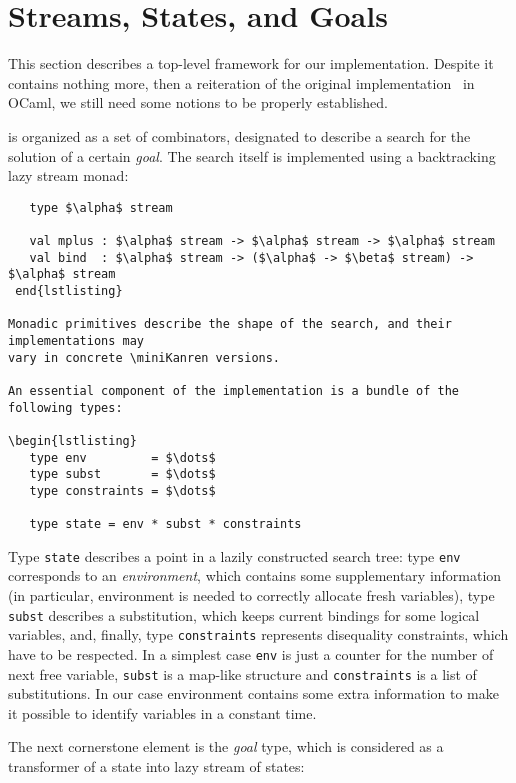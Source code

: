 \section{Streams, States, and Goals}
\label{sec:goals}

This section describes a top-level framework for our implementation. Despite it contains
nothing more, then a reiteration of the original implementation~\cite{MicroKanren, CKanren} 
in OCaml, we still need some notions to be properly established.

\miniKanren is organized as a set of combinators, designated to describe a search for
the solution of a certain \emph{goal}. The search itself is implemented using a
backtracking lazy stream monad:

\begin{lstlisting}
   type $\alpha$ stream 

   val mplus : $\alpha$ stream -> $\alpha$ stream -> $\alpha$ stream
   val bind  : $\alpha$ stream -> ($\alpha$ -> $\beta$ stream) -> $\alpha$ stream
 end{lstlisting}

Monadic primitives describe the shape of the search, and their implementations may 
vary in concrete \miniKanren versions.

An essential component of the implementation is a bundle of the following types:

\begin{lstlisting}
   type env         = $\dots$
   type subst       = $\dots$
   type constraints = $\dots$

   type state = env * subst * constraints
\end{lstlisting}

Type \lstinline{state} describes a point in a lazily constructed search tree: type \lstinline{env} corresponds 
to an \emph{environment}, which contains some supplementary information (in particular, environment is needed to
correctly allocate fresh variables), type \lstinline{subst} describes a substitution, which keeps current bindings 
for some logical variables, and, finally, type \lstinline{constraints} represents disequality constraints, 
which have to be respected. In a simplest case \lstinline{env} is just a counter for the number of next free
variable, \lstinline{subst} is a map-like structure and \lstinline{constraints} is a list of substitutions. In our
case environment contains some extra information to make it possible to identify variables in a constant time.

The next cornerstone element is the \emph{goal} type, which is considered as a transformer of a state into 
lazy stream of states:

